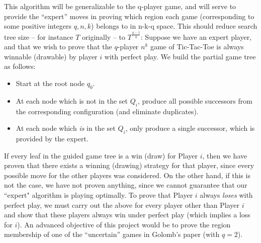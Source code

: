\documentclass[english, 11pt]{article}
\begin{document}
This algorithm will be generalizable to the q-player game, and will serve to provide the “expert” moves in proving which region each game (corresponding to some positive integers $q, n, k$) belongs to in n-k-q space. This should reduce search tree size – for instance $T$ originally – to $T^\frac{q-1}{q}$:
Suppose we have an expert player, and that we wish to prove that the $q$-player $n^k$ game of Tic-Tac-Toe is always winnable (drawable) by player $i$ with perfect play. We build the partial game tree as follows:
\begin{itemize}
	\item Start at the root node $q_0$. 
	\item At each node which is not in the set $Q_i$, produce all possible successors from the corresponding configuration (and eliminate duplicates).
	\item At each node which \emph{is} in the set $Q_i$, only produce a single successor, which is provided by the expert. 
\end{itemize}
If every leaf in the guided game tree is a win (draw) for Player $i$, then we have proven that there exists a winning (drawing) strategy for that player, since every possible move for the other players was considered. On the other hand, if this is not the case, we have not proven anything, since we cannot guarantee that our ``expert" algorithm is playing optimally. 
To prove that Player $i$ always \emph{loses} with perfect play, we must carry out the above for every player other than Player $i$ and show that these players always win under perfect play (which implies a loss for $i$). 
An advanced objective of this project would be to prove the region membership of one of the “uncertain” games in Golomb’s paper (with $q=2$). 
\end{document}
